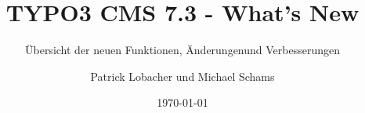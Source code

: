 %

%
%

\documentclass[t]{beamer}

\beamertemplatenavigationsymbolsempty

{
	\usetheme{typo3slides}
}

\title{TYPO3 CMS 7.3 - What's New}
\subtitle{Übersicht der neuen Funktionen, Änderungen\newline und Verbesserungen}
\author{
	\centerline{Patrick Lobacher und Michael Schams}
}

\date{\today}



\sharefont


\begingroup
	[default]
	\begin{frame}
		\titlepage
	\end{frame}
\endgroup


\section*{TYPO3 CMS 7.3 - What's New}
\begin{frame}[fragile]
	\frametitle{Kapitelübersicht}
	\framesubtitle{Kapitelübersicht}

	\begin{multicols}{2}
		\tableofcontents
	\end{multicols}

\end{frame}

